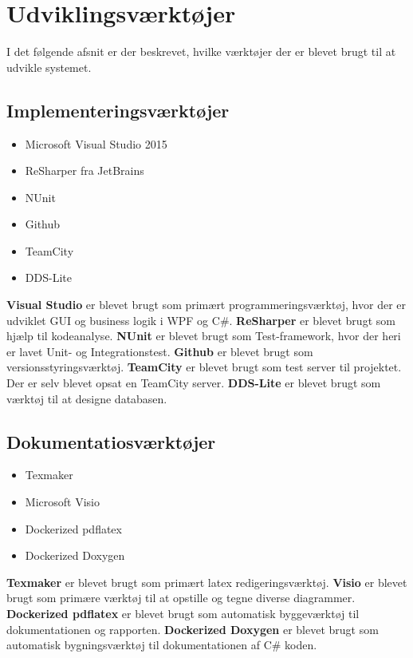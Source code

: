 \section{Udviklingsværktøjer}
\label{developmentstool}
I det følgende afsnit er der beskrevet, hvilke værktøjer der er blevet brugt til at udvikle systemet. 

\subsection*{Implementeringsværktøjer}
\begin{itemize}
	\item Microsoft Visual Studio 2015
	\item ReSharper fra JetBrains
	\item NUnit 
	\item Github
	\item TeamCity
	\item DDS-Lite	
\end{itemize}
\textbf{Visual Studio} er blevet brugt som primært programmeringsværktøj, hvor der er udviklet GUI og business logik i WPF og C\#. \textbf{ReSharper} er blevet brugt som hjælp til kodeanalyse. \textbf{NUnit} er blevet brugt som Test-framework, hvor der heri er lavet Unit- og Integrationstest. \textbf{Github} er blevet brugt som  versionsstyringsværktøj. \textbf{TeamCity} er blevet brugt som test server til projektet. Der er selv blevet opsat en TeamCity server. \textbf{DDS-Lite} er blevet brugt som værktøj til at designe databasen. 

\subsection*{Dokumentatiosværktøjer}
\begin{itemize}
	\item Texmaker
	\item Microsoft Visio
	\item Dockerized pdflatex
	\item Dockerized Doxygen
\end{itemize}
\textbf{Texmaker} er blevet brugt som primært latex redigeringsværktøj. \textbf{Visio} er blevet brugt som primære værktøj til at opstille og tegne diverse diagrammer. \textbf{Dockerized pdflatex} er blevet brugt som automatisk byggeværktøj til dokumentationen og rapporten. \textbf{Dockerized Doxygen} er blevet brugt som automatisk bygningsværktøj til dokumentationen af C\# koden. 